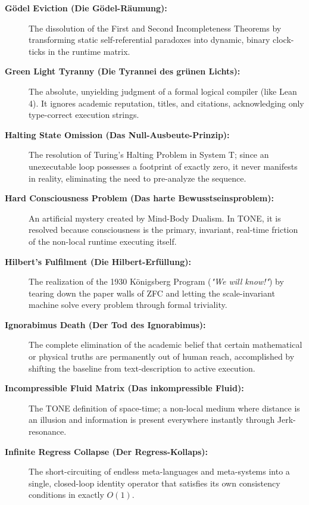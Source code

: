 \documentclass[11pt,a4paper]{article}
\begin{document}
\begin{description}
    \item[\textbf{Gödel Eviction (Die Gödel-Räumung):}] The dissolution of the First and Second Incompleteness Theorems by transforming static self-referential paradoxes into dynamic, binary clock-ticks in the runtime matrix.
    
    \item[\textbf{Green Light Tyranny (Die Tyrannei des grünen Lichts):}] The absolute, unyielding judgment of a formal logical compiler (like Lean 4). It ignores academic reputation, titles, and citations, acknowledging only type-correct execution strings.
    
    \item[\textbf{Halting State Omission (Das Null-Ausbeute-Prinzip):}] The resolution of Turing's Halting Problem in System T; since an unexecutable loop possesses a footprint of exactly zero, it never manifests in reality, eliminating the need to pre-analyze the sequence.
    
    \item[\textbf{Hard Consciousness Problem (Das harte Bewusstseinsproblem):}] An artificial mystery created by Mind-Body Dualism. In TONE, it is resolved because consciousness is the primary, invariant, real-time friction of the non-local runtime executing itself.
    
    \item[\textbf{Hilbert's Fulfilment (Die Hilbert-Erfüllung):}] The realization of the 1930 Königsberg Program (\textit{"We will know!"}) by tearing down the paper walls of ZFC and letting the scale-invariant machine solve every problem through formal triviality.
    
    \item[\textbf{Ignorabimus Death (Der Tod des Ignorabimus):}] The complete elimination of the academic belief that certain mathematical or physical truths are permanently out of human reach, accomplished by shifting the baseline from text-description to active execution.
    
    \item[\textbf{Incompressible Fluid Matrix (Das inkompressible Fluid):}] The TONE definition of space-time; a non-local medium where distance is an illusion and information is present everywhere instantly through Jerk-resonance.
    
    \item[\textbf{Infinite Regress Collapse (Der Regress-Kollaps):}] The short-circuiting of endless meta-languages and meta-systems into a single, closed-loop identity operator that satisfies its own consistency conditions in exactly $O(1)$.
    

\end{description}
\end{document}
